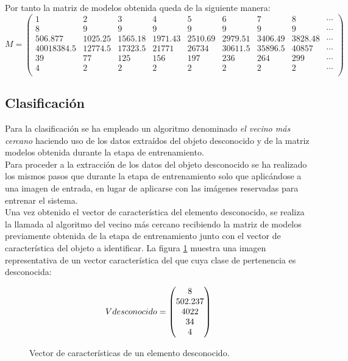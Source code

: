 Por tanto la matriz de modelos obtenida queda de la siguiente manera:\\

\[
 M =
 \begin{pmatrix}
  1 & 2 & 3 & 4 & 5 & 6 & 7 & 8 & \cdots\\
  8 & 9 & 9 & 9 & 9 & 9 & 9 & 9 & \cdots\\     
  506.877 & 1025.25 & 1565.18 & 1971.43 & 2510.69 & 2979.51 & 3406.49 & 3828.48 & \cdots\\
  4001 8384.5 & 12774.5 & 17323.5 & 21771 & 26734 & 30611.5 & 35896.5 & 40857 & \cdots\\ 
  39 & 77 & 125 & 156 & 197 & 236 & 264 & 299 & \cdots\\
  4 & 2 & 2 & 2 & 2 & 2 & 2 & 2 & \cdots\\
 \end{pmatrix}
\]

\subsection{Clasificación}

Para la clasificación se ha empleado un algoritmo denominado \emph{el vecino más cercano} haciendo uso de los datos extraídos del objeto desconocido y de la matriz modelos obtenida durante la etapa de entrenamiento. \\

Para proceder a la extracción de los datos del objeto desconocido se ha realizado los mismos pasos que durante la etapa de entrenamiento solo que aplicándose a una imagen de entrada, en lugar de aplicarse con las imágenes reservadas para entrenar el sistema.\\

Una vez obtenido el vector de característica del elemento desconocido, se realiza la llamada al algoritmo del vecino más cercano recibiendo la matriz de modelos previamente obtenida de la etapa de entrenamiento junto con el vector de característica del objeto a identificar. La figura \ref{math:vector-columna} muestra una imagen representativa de un vector característica del que cuya clase de pertenencia es desconocida:\\

\begin{figure}[H]
  \begin{center}
    \[
    Vdesconocido =
    \begin{pmatrix}
      8\\     
      502.237 \\
      4022 \\ 
      34 \\
      4 
      \nocite{}
    \end{pmatrix}
    \]
  \end{center}
  \caption{Vector de características de un elemento desconocido.}
  \label{math:vector-columna}
\end{figure}

